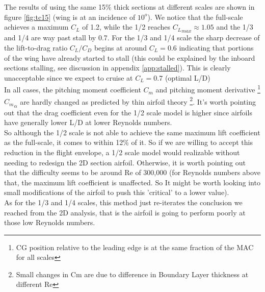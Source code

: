 \documentclass[titlepage,10pt]{article}
\begin{document}
The results of using the same 15\% thick sections at different scales are shown in figure \ref{fig:tc15} (wing is at an incidence of $10^o$). We notice that the full-scale achieves a maximum ${C_L}$ of 1.2, while the 1/2 reaches ${C_L}_{max}\approx1.05$ and the 1/3 and 1/4 are way past stall by 0.7. For the 1/3 and 1/4 scale the sharp decrease of the lift-to-drag ratio ${C_L}/{C_D}$ begins at around ${C_L}=0.6$ indicating that portions of the wing have already started to stall (this could be explained by the inboard sections stalling, see discussion in appendix \ref{app:stalled}). This is clearly unacceptable since we expect to cruise at ${C_L}=0.7$ (optimal L/D)\\

In all cases, the pitching moment coefficient ${C_m}$ and pitching moment derivative \footnote{CG position relative to the leading edge is at the same fraction of the MAC for all scales} ${C_m}_{\alpha}$ are hardly changed as predicted by thin airfoil theory \footnote{Small changes in Cm are due to difference in Boundary Layer thickness at different Re}. It's worth pointing out that the drag coefficient even for the 1/2 scale model is higher since airfoils have generally lower L/D at lower Reynolds numbers.\\

So although the 1/2 scale is not able to achieve the same maximum lift coefficient as the full-scale, it comes to within 12\% of it. So if we are willing to accept this reduction in the flight envelope, a 1/2 scale model would realizable without needing to redesign the 2D section airfoil. Otherwise, it is worth pointing out that the difficulty seems to be around Re of 300,000 (for Reynolds numbers above that, the maximum lift coefficient is unaffected. So It might be worth looking into small modifications of the airfoil to push this 'critical' to a lower value).\\

As for the 1/3 and 1/4 scales, this method just re-iterates the conclusion we reached from the 2D analysis, that is the airfoil is going to perform poorly at those low Reynolds numbers.
\end{document}
